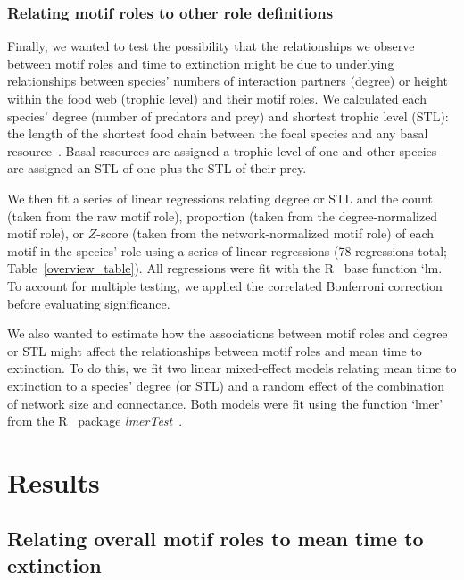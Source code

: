 \documentclass[12pt]{article}
\begin{document}
\begin{spacing}{2.0}
		\subsubsection*{Relating motif roles to other role definitions}
		
			Finally, we wanted to test the possibility that the relationships we observe between motif roles and time to extinction might be due to underlying relationships between species' numbers of interaction partners (degree) or height within the food web (trophic level) and their motif roles.
			We calculated each species' degree (number of predators and prey) and shortest trophic level (STL): the length of the shortest food chain between the focal species and any basal resource~\citep{Hairston1993}. 
            Basal resources are assigned a trophic level of one and other species are assigned an STL of one plus the STL of their prey.
			

            We then fit a series of linear regressions relating degree or STL and the count (taken from the raw motif role), proportion (taken from the degree-normalized motif role), or $Z$-score (taken from the network-normalized motif role) of each motif in the species' role using a series of linear regressions (78 regressions total; Table~\ref{overview_table}).
			All regressions were fit with the R~\citep{R} base function `lm.
            To account for multiple testing, we applied the correlated Bonferroni correction~\citep{Drezner2016} before evaluating significance.


            We also wanted to estimate how the associations between motif roles and degree or STL might affect the relationships between motif roles and mean time to extinction.
            To do this, we fit two linear mixed-effect models relating mean time to extinction to a species' degree (or STL) and a random effect of the combination of network size and connectance. 
            Both models were fit using the function `lmer' from the R~\citep{R} package \emph{lmerTest}~\citep{lmerTest}.


\section*{Results}
	
    \subsection*{Relating overall motif roles to mean time to extinction}
    

\end{spacing}
\end{document}
